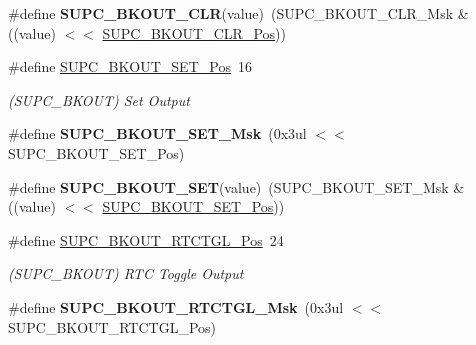 \begin{DoxyCompactItemize}
\item 
\hypertarget{group___s_a_m_l21___s_u_p_c_gab2757a2e0584167870b8f54c27b2b372}{}\#define {\bfseries S\+U\+P\+C\+\_\+\+B\+K\+O\+U\+T\+\_\+\+C\+L\+R}(value)~(S\+U\+P\+C\+\_\+\+B\+K\+O\+U\+T\+\_\+\+C\+L\+R\+\_\+\+Msk \& ((value) $<$$<$ \hyperlink{group___s_a_m_l21___s_u_p_c_gaedbc4f6fd0e8fc76d6a43a499a4ec2b3}{S\+U\+P\+C\+\_\+\+B\+K\+O\+U\+T\+\_\+\+C\+L\+R\+\_\+\+Pos}))\label{group___s_a_m_l21___s_u_p_c_gab2757a2e0584167870b8f54c27b2b372}

\item 
\hypertarget{group___s_a_m_l21___s_u_p_c_gaa9ccc9bebfce68ff2654716bee7a5170}{}\#define \hyperlink{group___s_a_m_l21___s_u_p_c_gaa9ccc9bebfce68ff2654716bee7a5170}{S\+U\+P\+C\+\_\+\+B\+K\+O\+U\+T\+\_\+\+S\+E\+T\+\_\+\+Pos}~16\label{group___s_a_m_l21___s_u_p_c_gaa9ccc9bebfce68ff2654716bee7a5170}

\begin{DoxyCompactList}\small\item\em (S\+U\+P\+C\+\_\+\+B\+K\+O\+U\+T) Set Output \end{DoxyCompactList}\item 
\hypertarget{group___s_a_m_l21___s_u_p_c_gae05760eb679cb4ee7c580d33a5015800}{}\#define {\bfseries S\+U\+P\+C\+\_\+\+B\+K\+O\+U\+T\+\_\+\+S\+E\+T\+\_\+\+Msk}~(0x3ul $<$$<$ S\+U\+P\+C\+\_\+\+B\+K\+O\+U\+T\+\_\+\+S\+E\+T\+\_\+\+Pos)\label{group___s_a_m_l21___s_u_p_c_gae05760eb679cb4ee7c580d33a5015800}

\item 
\hypertarget{group___s_a_m_l21___s_u_p_c_gadf4072f001124aa1219b003a0da33ead}{}\#define {\bfseries S\+U\+P\+C\+\_\+\+B\+K\+O\+U\+T\+\_\+\+S\+E\+T}(value)~(S\+U\+P\+C\+\_\+\+B\+K\+O\+U\+T\+\_\+\+S\+E\+T\+\_\+\+Msk \& ((value) $<$$<$ \hyperlink{group___s_a_m_l21___s_u_p_c_gaa9ccc9bebfce68ff2654716bee7a5170}{S\+U\+P\+C\+\_\+\+B\+K\+O\+U\+T\+\_\+\+S\+E\+T\+\_\+\+Pos}))\label{group___s_a_m_l21___s_u_p_c_gadf4072f001124aa1219b003a0da33ead}

\item 
\hypertarget{group___s_a_m_l21___s_u_p_c_ga41b7dbf537a1cc2a51f191d2664e67dc}{}\#define \hyperlink{group___s_a_m_l21___s_u_p_c_ga41b7dbf537a1cc2a51f191d2664e67dc}{S\+U\+P\+C\+\_\+\+B\+K\+O\+U\+T\+\_\+\+R\+T\+C\+T\+G\+L\+\_\+\+Pos}~24\label{group___s_a_m_l21___s_u_p_c_ga41b7dbf537a1cc2a51f191d2664e67dc}

\begin{DoxyCompactList}\small\item\em (S\+U\+P\+C\+\_\+\+B\+K\+O\+U\+T) R\+T\+C Toggle Output \end{DoxyCompactList}\item 
\hypertarget{group___s_a_m_l21___s_u_p_c_ga31e70e0cc9d396b912f13f1245796e6b}{}\#define {\bfseries S\+U\+P\+C\+\_\+\+B\+K\+O\+U\+T\+\_\+\+R\+T\+C\+T\+G\+L\+\_\+\+Msk}~(0x3ul $<$$<$ S\+U\+P\+C\+\_\+\+B\+K\+O\+U\+T\+\_\+\+R\+T\+C\+T\+G\+L\+\_\+\+Pos)\label{group___s_a_m_l21___s_u_p_c_ga31e70e0cc9d396b912f13f1245796e6b}


\end{DoxyCompactItemize}
